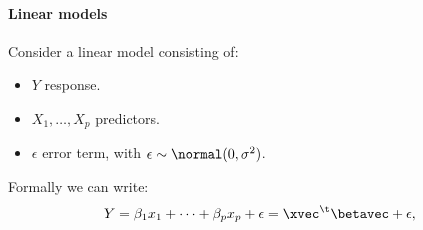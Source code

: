\paragraph{Linear models}

Consider a linear model consisting of:
\begin{itemize}
    \item $Y$ response.
    \item $X_1, \dots, X_p$ predictors.
    \item $\epsilon$ error term, with $\epsilon \sim \normal(0, \sigma^2)$.
\end{itemize}

Formally we can write:
\begin{equation}
    Y = \beta_1x_1 + \dots + \beta_px_p + \epsilon = \xvec^\t\betavec + \epsilon,
\end{equation}

